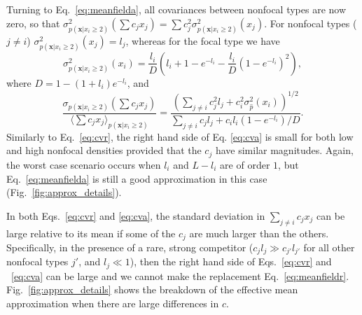 \documentclass[12pt]{article}
\begin{document}
Turning to Eq.~\eqref{eq:meanfielda}, all covariances between nonfocal types are now zero, so that $\sigma_{p({\mathbf x}|x_i\geq 2)}^2(\sum c_j x_j)=\sum c_j^2 \sigma_{p({\mathbf x}|x_i\geq 2)}^2(x_j)$. For nonfocal types ($j\neq i$) $\sigma_{p({\mathbf x}|x_i\geq 2)}^2(x_j)=l_j$, whereas for the focal type we have  
\begin{equation}
\sigma_{p({\mathbf x}|x_i\geq 2)}^2(x_i)=\frac{l_i}{D}\left(l_i+1-e^{-l_i}-\frac{l_i}{D}\left(1-e^{-l_i}\right)^2\right),
\end{equation}
where $D= 1-(1+l_i)e^{-l_i}$, and 
\begin{equation}
\frac{\sigma_{p({\mathbf x}|x_i\geq 2)}(\sum c_j x_j)}{\langle\sum c_j x_j\rangle_{p({\mathbf x}|x_i\geq 2)}} = \frac{\left(\sum_{j\neq i} c_j^2 l_j + c_i^2 \sigma_{\hat{p}}^2(x_i)\right)^{1/2}}{\sum_{j\neq i} c_j l_j + c_i l_i (1-e^{-l_i})/D} \label{eq:cva}.
\end{equation}
Similarly to Eq.~\eqref{eq:cvr}, the right hand side of Eq. \eqref{eq:cva} is small for both low and high nonfocal densities provided that the $c_j$ have similar magnitudes. Again, the worst case scenario occurs when $l_i$ and $L-l_i$ are of order $1$, but Eq.~\eqref{eq:meanfielda} is still a good approximation in this case (Fig.~\ref{fig:approx_details}).

In both Eqs.~\eqref{eq:cvr} and \eqref{eq:cva}, the standard deviation in $\sum_{j\neq i} c_j x_j$ can be large relative to its mean if some of the $c_j$ are much larger than the others. Specifically, in the presence of a rare, strong competitor ($c_j l_j\gg c_{j'} l_{j'}$ for all other nonfocal types $j'$, and $l_j\ll 1$), then the right hand side of Eqs.~\eqref{eq:cvr} and ~\eqref{eq:cva} can be large and we cannot make the replacement Eq.~\eqref{eq:meanfieldr}. Fig.~\ref{fig:approx_details} shows the breakdown of the effective mean approximation when there are large differences in $c$. 
\end{document}
